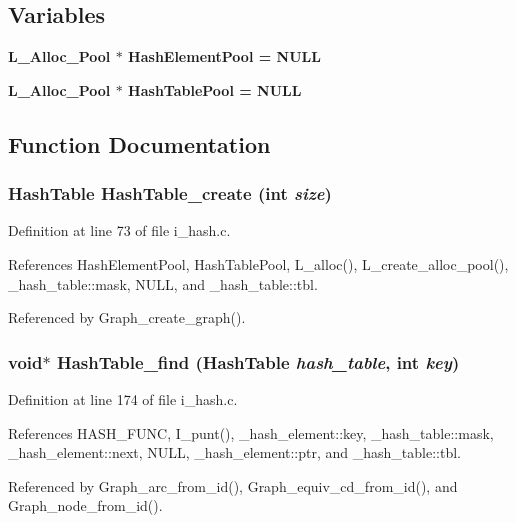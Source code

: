 \subsection*{Variables}
\begin{CompactItemize}
\item 
\bf{L\_\-Alloc\_\-Pool} $\ast$ \bf{Hash\-Element\-Pool} = NULL
\item 
\bf{L\_\-Alloc\_\-Pool} $\ast$ \bf{Hash\-Table\-Pool} = NULL
\end{CompactItemize}


\subsection{Function Documentation}
\subsubsection{\setlength{\rightskip}{0pt plus 5cm}\bf{Hash\-Table} Hash\-Table\_\-create (int {\em size})}\label{i__hash_8c_ccc5de33b1b451799d22a19f9d768c6a}




Definition at line 73 of file i\_\-hash.c.

References Hash\-Element\-Pool, Hash\-Table\-Pool, L\_\-alloc(), L\_\-create\_\-alloc\_\-pool(), \_\-hash\_\-table::mask, NULL, and \_\-hash\_\-table::tbl.

Referenced by Graph\_\-create\_\-graph().
\subsubsection{\setlength{\rightskip}{0pt plus 5cm}void$\ast$ Hash\-Table\_\-find (\bf{Hash\-Table} {\em hash\_\-table}, int {\em key})}\label{i__hash_8c_a4b73ed98723e1c8083a9ceda8ffe15d}




Definition at line 174 of file i\_\-hash.c.

References HASH\_\-FUNC, I\_\-punt(), \_\-hash\_\-element::key, \_\-hash\_\-table::mask, \_\-hash\_\-element::next, NULL, \_\-hash\_\-element::ptr, and \_\-hash\_\-table::tbl.

Referenced by Graph\_\-arc\_\-from\_\-id(), Graph\_\-equiv\_\-cd\_\-from\_\-id(), and Graph\_\-node\_\-from\_\-id().
